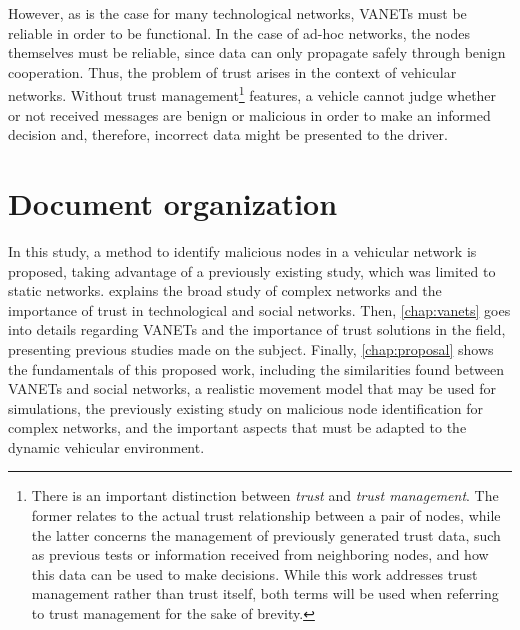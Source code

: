 However, as is the case for many technological networks, VANETs must be reliable in order to be functional.
In the case of ad-hoc networks, the nodes themselves must be reliable, since data can only propagate safely through benign cooperation.
Thus, the problem of trust arises in the context of vehicular networks.
Without trust management\footnote{There is an important distinction between \textit{trust} and \textit{trust management}.
The former relates to the actual trust relationship between a pair of nodes, while the latter concerns the management of previously generated trust data, such as previous tests or information received from neighboring nodes, and how this data can be used to make decisions.
While this work addresses trust management rather than trust itself, both terms will be used when referring to trust management for the sake of brevity.} features, a vehicle cannot judge whether or not received messages are benign or malicious in order to make an informed decision and, therefore, incorrect data might be presented to the driver.


\section{Document organization}
In this study, a method to identify malicious nodes in a vehicular network is proposed, taking advantage of a previously existing study, which was limited to static networks.
 explains the broad study of complex networks and the importance of trust in technological and social networks.
Then, \cref{chap:vanets} goes into details regarding VANETs and the importance of trust solutions in the field, presenting previous studies made on the subject.
Finally, \cref{chap:proposal} shows the fundamentals of this proposed work, including the similarities found between VANETs and social networks, a realistic movement model that may be used for simulations, the previously existing study on malicious node identification for complex networks, and the important aspects that must be adapted to the dynamic vehicular environment.
